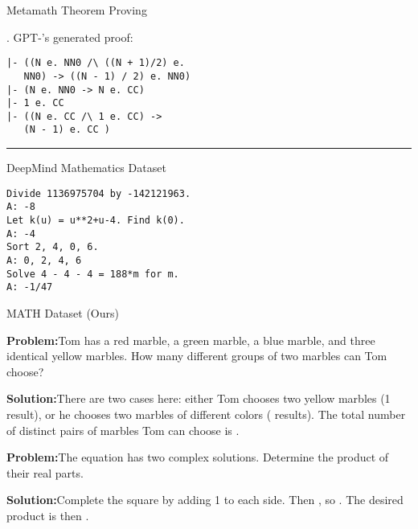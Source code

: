 \documentclass{article}
\begin{document}
\begin{figure*}[t]
\noindent
\begin{minipage}{0.50\textwidth}
\begin{center}
\large{Metamath Theorem Proving}
\end{center}
\begin{flushleft}
.
GPT-'s generated proof:
\begin{verbatim}
|- ((N e. NN0 /\ ((N + 1)/2) e.
   NN0) -> ((N - 1) / 2) e. NN0)
|- (N e. NN0 -> N e. CC)
|- 1 e. CC
|- ((N e. CC /\ 1 e. CC) ->
   (N - 1) e. CC )
\end{verbatim}
\vspace{-10pt}
\begin{center}

\end{center}

\hrule
\begin{center}
\large{DeepMind Mathematics Dataset}
\end{center}

\begin{verbatim}
Divide 1136975704 by -142121963.
A: -8
Let k(u) = u**2+u-4. Find k(0).
A: -4
Sort 2, 4, 0, 6.
A: 0, 2, 4, 6
Solve 4 - 4 - 4 = 188*m for m.
A: -1/47
\end{verbatim}

\end{flushleft}
\end{minipage}\vline\phantom{v}\hfill \begin{minipage}{0.50\textwidth} 
\begin{flushleft}
\begin{center}
\large{MATH Dataset (Ours)}
\end{center}

\textbf{Problem:}\quad Tom has a red marble, a green marble, a blue marble, and three identical yellow marbles. How many different groups of two marbles can Tom choose?

\textbf{Solution:}\quad There are two cases here: either Tom chooses two yellow marbles (1 result), or he chooses two marbles of different colors ( results). The total number of distinct pairs of marbles Tom can choose is .



\textbf{Problem:}\quad The equation  has two complex solutions. Determine the product of their real parts.

\textbf{Solution:}\quad Complete the square by adding 1 to each side. Then , so . The desired product is then .


\end{flushleft}
\end{minipage}

\caption{Previous work is based on formal theorem provers or straightforward plug-and-chug problems. Our dataset, MATH, has competition mathematics problems with step-by-step solutions written in \LaTeX{} and natural language. Models are tasked with generating tokens to construct the final (boxed) answer.}
\label{fig:splash}
\vspace{-10pt}
\end{figure*}
\end{document}
